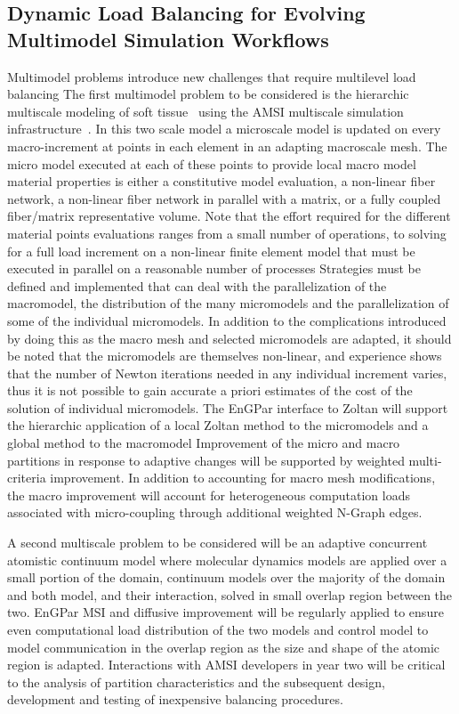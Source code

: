 \documentclass[12pt]{article}
\begin{document}
\subsection{Dynamic Load Balancing for Evolving Multimodel Simulation Workflows}
Multimodel problems introduce new challenges that require multilevel load
balancing The first multimodel problem to be considered is the hierarchic
multiscale modeling of soft tissue~\cite{luo07} using the AMSI multiscale
simulation infrastructure~\cite{del09}.
In this two scale model a microscale model is updated on every macro-increment
at points in each element in an adapting macroscale mesh.
The micro model executed at each of these points to provide local macro model
material properties is either a constitutive model evaluation, a non-linear
fiber network, a non-linear fiber network in parallel with a matrix, or a fully
coupled fiber/matrix representative volume.
Note that the effort required for the different material points evaluations
ranges from a small number of operations, to solving for a full load increment
on a non-linear finite element model that must be executed in parallel on a
reasonable number of processes Strategies must be defined and implemented that
can deal with the parallelization of the macromodel, the distribution of the
many micromodels and the parallelization of some of the individual micromodels.
In addition to the complications introduced by doing this as the macro mesh
and selected micromodels are adapted, it should be noted that the micromodels
are themselves non-linear, and experience shows that the number of Newton
iterations needed in any individual increment varies, thus it is not possible
to gain accurate a priori estimates of the cost of the solution of individual
micromodels.
The EnGPar interface to Zoltan will support the hierarchic application of a
local Zoltan method to the micromodels and a global method to the macromodel
Improvement of the micro and macro partitions in response to adaptive changes
will be supported by weighted multi-criteria improvement.
In addition to accounting for macro mesh modifications, the macro improvement
will account for heterogeneous computation loads associated with micro-coupling
through additional weighted N-Graph edges.

A second multiscale problem to be considered will be an adaptive concurrent
atomistic continuum model where molecular dynamics models are applied over a
small portion of the domain, continuum models over the majority of the domain
and both model, and their interaction, solved in small overlap region between
the two.
EnGPar MSI and diffusive improvement will be regularly applied to ensure even
computational load distribution of the two models and control model to model
communication in the overlap region as the size and shape of the atomic region
is adapted.
Interactions with AMSI developers in year two will be critical to the analysis
of partition characteristics and the subsequent design, development and testing
of inexpensive balancing procedures.
\end{document}
